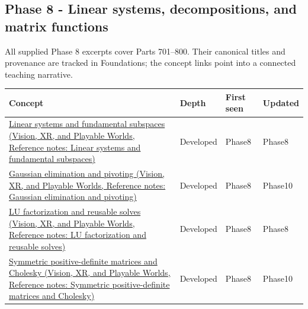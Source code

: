 \subsection{Phase 8 - Linear systems, decompositions, and matrix functions}\label{appendix-a6d556a4ef50-phase-8---linear-systems-decompositions-and-matrix-functions}

All supplied Phase 8 excerpts cover Parts 701--800. Their canonical titles and provenance are tracked in Foundations; the concept links point into a connected teaching narrative.

{\def\LTcaptype{none} %
\begin{longtable}[]{@{}
  >{\raggedright\arraybackslash}p{}
  >{\raggedright\arraybackslash}p{}
  >{\raggedright\arraybackslash}p{}
  >{\raggedright\arraybackslash}p{}@{}}
\toprule\noalign{}
\begin{minipage}[b]{\linewidth}\raggedright
Concept
\end{minipage} & \begin{minipage}[b]{\linewidth}\raggedright
Depth
\end{minipage} & \begin{minipage}[b]{\linewidth}\raggedright
First seen
\end{minipage} & \begin{minipage}[b]{\linewidth}\raggedright
Updated
\end{minipage} \\
\midrule\noalign{}
\endhead
\bottomrule\noalign{}
\endlastfoot
\href{../07-Vision-XR-and-Playable-Worlds/main.pdf\#nameddest=appendix-8572a4a060c1}{Linear systems and fundamental subspaces (Vision, XR, and Playable Worlds, Reference notes: Linear systems and fundamental subspaces)} & Developed & Phase8 & Phase8 \\
\href{../07-Vision-XR-and-Playable-Worlds/main.pdf\#nameddest=appendix-f6e77f4a200f}{Gaussian elimination and pivoting (Vision, XR, and Playable Worlds, Reference notes: Gaussian elimination and pivoting)} & Developed & Phase8 & Phase10 \\
\href{../07-Vision-XR-and-Playable-Worlds/main.pdf\#nameddest=appendix-55e4b5b0a1e6}{LU factorization and reusable solves (Vision, XR, and Playable Worlds, Reference notes: LU factorization and reusable solves)} & Developed & Phase8 & Phase8 \\
\href{../07-Vision-XR-and-Playable-Worlds/main.pdf\#nameddest=appendix-50d2ea3c9b26}{Symmetric positive-definite matrices and Cholesky (Vision, XR, and Playable Worlds, Reference notes: Symmetric positive-definite matrices and Cholesky)} & Developed & Phase8 & Phase10 \\

\end{longtable}}

